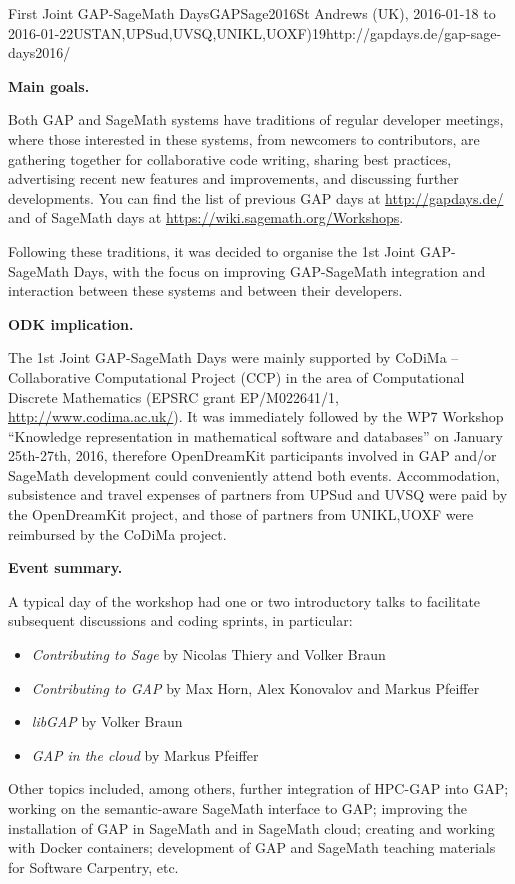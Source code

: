 \begin{event}{First Joint GAP-SageMath Days}{GAPSage2016}{St Andrews (UK),
2016-01-18 to 2016-01-22}{USTAN,UPSud,UVSQ,UNIKL,UOXF)}{19}{http://gapdays.de/gap-sage-days2016/}

\textbf{Main goals.}

Both GAP and SageMath systems have traditions of regular developer meetings, where those
interested in these systems, from newcomers to contributors, are gathering together for
collaborative code writing, sharing best practices, advertising recent new features and
improvements, and discussing further developments. You can find the list of previous GAP 
days at \url{http://gapdays.de/} and of SageMath days at \url{https://wiki.sagemath.org/Workshops}.

Following these traditions, it was decided to organise the 1st Joint GAP-SageMath Days, with the
focus on improving GAP-SageMath integration and interaction between these systems and between
their developers.

\textbf{ODK implication.} 

The 1st Joint GAP-SageMath Days were mainly supported by CoDiMa -- Collaborative Computational
Project (CCP) in the area of Computational Discrete Mathematics (EPSRC grant EP/M022641/1,
\url{http://www.codima.ac.uk/}). It was immediately followed by the WP7 Workshop ``Knowledge
representation in mathematical software and databases'' on January 25th-27th, 2016, therefore
OpenDreamKit participants involved in GAP and/or SageMath development could conveniently attend
both events. Accommodation, subsistence and travel expenses of partners from UPSud and UVSQ
were paid by the OpenDreamKit project, and those of partners from UNIKL,UOXF were reimbursed
by the CoDiMa project.

\textbf{Event summary.} 

A typical day of the workshop had one or two introductory talks to facilitate subsequent
discussions and coding sprints, in particular:
\begin{itemize}
\item \emph{Contributing to Sage} by Nicolas Thiery and Volker Braun
\item \emph{Contributing to GAP } by Max Horn, Alex Konovalov and Markus Pfeiffer
\item \emph{libGAP} by Volker Braun
\item \emph{GAP in the cloud} by Markus Pfeiffer
\end{itemize}
Other topics included, among others,
further integration of HPC-GAP into GAP;
working on the semantic-aware SageMath interface to GAP;
improving the installation of GAP in SageMath and in SageMath cloud;
creating and working with Docker containers;
development of GAP and SageMath teaching materials for Software Carpentry,
etc.


\end{event}
